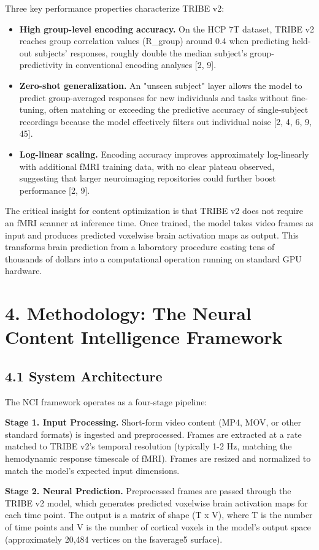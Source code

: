 \documentclass[11pt,letterpaper]{article}
\begin{document}
Three key performance properties characterize TRIBE v2:
\begin{itemize}
  \item \textbf{High group-level encoding accuracy.} On the HCP 7T dataset, TRIBE v2 reaches group correlation values (R\_group) around 0.4 when predicting held-out subjects' responses, roughly double the median subject's group-predictivity in conventional encoding analyses [2, 9].
  \item \textbf{Zero-shot generalization.} An "unseen subject" layer allows the model to predict group-averaged responses for new individuals and tasks without fine-tuning, often matching or exceeding the predictive accuracy of single-subject recordings because the model effectively filters out individual noise [2, 4, 6, 9, 45].
  \item \textbf{Log-linear scaling.} Encoding accuracy improves approximately log-linearly with additional fMRI training data, with no clear plateau observed, suggesting that larger neuroimaging repositories could further boost performance [2, 9].
\end{itemize}
The critical insight for content optimization is that TRIBE v2 does not require an fMRI scanner at inference time. Once trained, the model takes video frames as input and produces predicted voxelwise brain activation maps as output. This transforms brain prediction from a laboratory procedure costing tens of thousands of dollars into a computational operation running on standard GPU hardware.


\section{4. Methodology: The Neural Content Intelligence Framework}

\subsection{4.1 System Architecture}

The NCI framework operates as a four-stage pipeline:

\textbf{Stage 1. Input Processing.} Short-form video content (MP4, MOV, or other standard formats) is ingested and preprocessed. Frames are extracted at a rate matched to TRIBE v2's temporal resolution (typically 1-2 Hz, matching the hemodynamic response timescale of fMRI). Frames are resized and normalized to match the model's expected input dimensions.

\textbf{Stage 2. Neural Prediction.} Preprocessed frames are passed through the TRIBE v2 model, which generates predicted voxelwise brain activation maps for each time point. The output is a matrix of shape (T x V), where T is the number of time points and V is the number of cortical voxels in the model's output space (approximately 20,484 vertices on the fsaverage5 surface).
\end{document}
